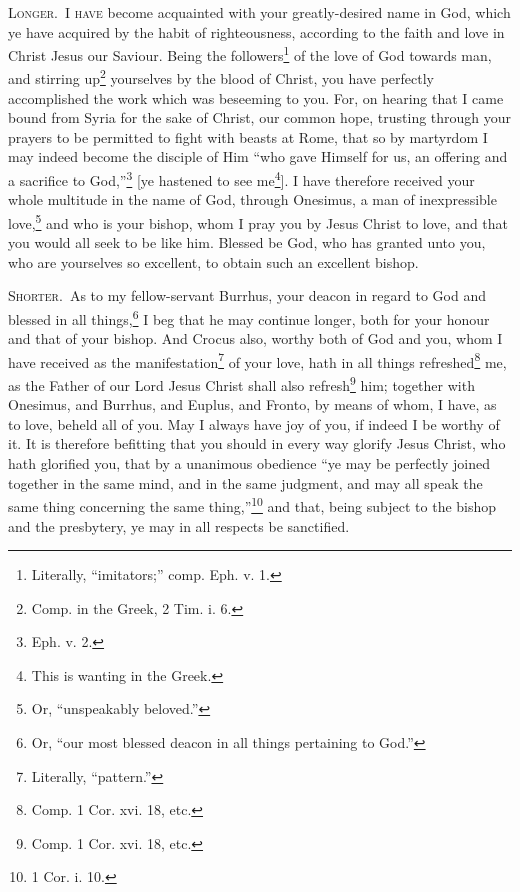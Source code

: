 \textsc{Longer.}~\textsc{I have} become acquainted with your greatly-desired name in God, which ye have acquired by the habit of righteousness, according to the faith and love in Christ Jesus our Saviour. Being the followers\footnote{Literally, “imitators;” comp. Eph. v. 1.} of the love of God towards man, and stirring up\footnote{Comp. in the Greek, 2 Tim. i. 6.} yourselves by the blood of Christ, you have perfectly accomplished the work which was beseeming to you. For, on hearing that I came bound from Syria for the sake of Christ, our common hope, trusting through your prayers to be permitted to fight with beasts at Rome, that so by martyrdom I may indeed become the disciple of Him “who gave Himself for us, an offering and a sacrifice to God,”\footnote{Eph. v. 2.} [ye hastened to see me\footnote{This is wanting in the Greek.}]. I have therefore received your whole multitude in the name of God, through Onesimus, a man of inexpressible love,\footnote{Or, “unspeakably beloved.”} and who is your bishop, whom I pray you by Jesus Christ to love, and that you would all seek to be like him. Blessed be God, who has granted unto you, who are yourselves so excellent, to obtain such an excellent bishop.


\textsc{Shorter.}~As to my fellow-servant Burrhus, your deacon in regard to God and blessed in all things,\footnote{Or, “our most blessed deacon in all things pertaining to God.”} I beg that he may continue longer, both for your honour and that of your bishop. And Crocus also, worthy both of God and you, whom I have received as the manifestation\footnote{Literally, “pattern.”} of your love, hath in all things refreshed\footnote{Comp. 1 Cor. xvi. 18, etc.} me, as the Father of our Lord Jesus Christ shall also refresh\footnote{Comp. 1 Cor. xvi. 18, etc.} him; together with Onesimus, and Burrhus, and Euplus, and Fronto, by means of whom, I have, as to love, beheld all of you. May I always have joy of you, if indeed I be worthy of it. It is therefore befitting that you should in every way glorify Jesus Christ, who hath glorified you, that by a unanimous obedience “ye may be perfectly joined together in the same mind, and in the same judgment, and may all speak the same thing concerning the same thing,”\footnote{1 Cor. i. 10.} and that, being subject to the bishop and the presbytery, ye may in all respects be sanctified.

